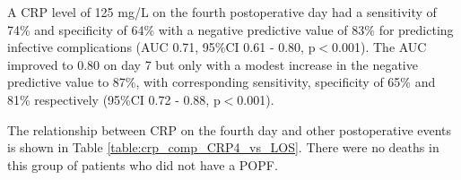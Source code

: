 A CRP level of 125 mg/L on the fourth postoperative day had a sensitivity of 74\% and specificity of 64\% with a negative predictive value of 83\% for predicting infective complications (AUC 0.71, 95\%CI 0.61 - 0.80, p$<$0.001). 
The AUC improved to 0.80 on day 7 but only with a modest increase in the negative predictive value to 87\%, with corresponding sensitivity, specificity of 65\% and 81\% respectively (95\%CI 0.72 - 0.88, p$<$0.001).

The relationship between CRP on the fourth day and other postoperative events is shown in Table \ref{table:crp_comp_CRP4_vs_LOS}. 
There were no deaths in this group of patients who did not have a POPF. 


\clearpage
